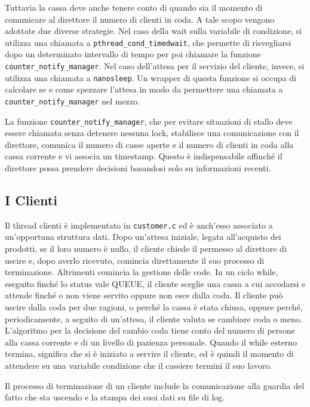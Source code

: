 \documentclass[a4paper,11pt] {article}
\begin{document}
Tuttavia la cassa deve anche tenere conto di quando sia il momento di comunicare al direttore il numero di clienti in coda. A tale scopo vengono adottate due diverse strategie. Nel caso della wait sulla variabile di condizione, si utilizza una chiamata a \lstinline{pthread_cond_timedwait}, che permette di risvegliarsi dopo un determinato intervallo di tempo per poi chiamare la funzione \lstinline{counter_notify_manager}. Nel caso dell'attesa per il servizio del cliente, invece, si utilizza una chiamata a \lstinline{nanosleep}. Un wrapper di questa funzione si occupa di calcolare se e come spezzare l'attesa in modo da permettere una chiamata a \lstinline{counter_notify_manager} nel mezzo.

La funzione \lstinline{counter_notify_manager}, che per evitare situazioni di stallo deve essere chiamata senza detenere nessuna lock, stabilisce una comunicazione con il direttore, comunica il numero di casse aperte e il numero di clienti in coda alla cassa corrente e vi associa un timestamp. Questo è indispensabile affinché il direttore possa prendere decisioni basandosi solo su informazioni recenti.

\subsection*{I Clienti}

Il thread clienti è implementato in \lstinline{customer.c} ed è anch'esso associato a un'opportuna struttura dati. Dopo un'attesa iniziale, legata all'acquisto dei prodotti, se il loro numero è nullo, il cliente chiede il permesso al direttore di uscire e, dopo averlo ricevuto, comincia direttamente il suo processo di terminazione. Altrimenti comincia la gestione delle code. In un ciclo while, eseguito finché lo status vale QUEUE, il cliente sceglie una cassa a cui accodarsi e attende finché o non viene servito oppure non esce dalla coda. Il cliente può uscire dalla coda per due ragioni, o perché la cassa è stata chiusa, oppure perché, periodicamente, a seguito di un'attesa, il cliente valuta se cambiare coda o meno. L'algoritmo per la decisione del cambio coda tiene conto del numero di persone alla cassa corrente e di un livello di pazienza personale.
Quando il while esterno termina, significa che si è iniziato a servire il cliente, ed è quindi il momento di attendere su una variabile condizione che il cassiere termini il suo lavoro.

Il processo di terminazione di un cliente include la comunicazione alla guardia del fatto che sta uscendo e la stampa dei suoi dati su file di log.
\end{document}
